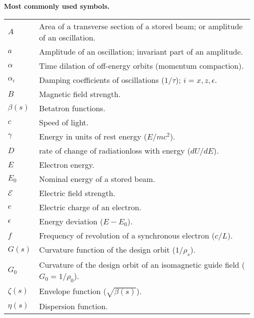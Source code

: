 \begin{center}
	\textbf{\large Most commonly used symbols.}
\end{center}

\begin{tabularx}{\linewidth}{@{}lX@{}}
	$A$			& Area of a transverse section of a stored beam; or amplitude of an oscillation.\\
	$a$			& Amplitude of an oscillation; invariant part of an amplitude.\\
    $\alpha$	& Time dilation of off-energy orbits (momentum compaction).\\
	$\alpha_i$	& Damping coefficients of oscillations ($1/\tau$); $i = x, z, \epsilon$.\\
    $B$			& Magnetic field strength.\\
	$\beta(s)$	& Betatron functions.\\
	$c$			& Speed of light.\\
	$\gamma$	& Energy in units of rest energy ($E/mc^2$).\\
	$D$			& %
    				rate of change of radiationloss with energy ($dU/dE$).\\
	$E$			& Electron energy.\\
    $E_0$		& Nominal energy of a stored beam.\\
    $\mathscr{E}$ & Electric field strength.\\
    $e$			& Electric charge of an electron.\\
	$\epsilon$	& Energy deviation ($E - E_0$).\\
    $f$			& Frequency of revolution of a synchronous electron ($c/L$).\\
    $G(s)$		& Curvature function of the design orbit ($1/\rho_s$).\\
    $G_0$		& Curvature of the design orbit of an isomagnetic guide field ($G_0 = 1/\rho_0$).\\
	$\zeta(s)$	& Envelope function ($\sqrt{\beta(s)}$).\\
    $\eta(s)$	& Dispersion function.\\

\end{tabularx}
